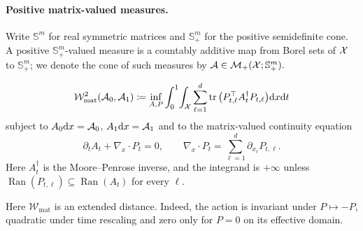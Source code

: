 \paragraph{Positive matrix-valued measures.}
\begin{defn}\label{def-positive-matrix-valued-measure}
Write $\mathbb S^m$ for real symmetric matrices and $\mathbb S_+^m$ for the positive semidefinite cone. A positive $\mathbb S_+^m$-valued measure is a countably additive map from Borel sets of $\mathcal{X}$ to $\mathbb S_+^m$; we denote the cone of such measures by
\(\mathcal A\in\mathcal{M}_+(\mathcal{X};\mathbb S_+^m).\)
\end{defn}
\begin{defn}\label{def-matrix-valued-dynamic-transport}
\begin{equation}\label{eq-matrix-valued-bb}
\begin{aligned}
\mathcal W_{\mathrm{mat}}^2(\mathcal A_0,\mathcal A_1)
\coloneqq
\inf_{A,P}\int_0^1\!\int_{\mathcal{X}}
\sum_{\ell=1}^d \operatorname{tr}\big(P_{t,\ell}^{\top} A_t^\dagger P_{t,\ell}\big)\mathrm{d} x\mathrm{d} t
\end{aligned}
\end{equation}
subject to $A_0\mathrm{d} x=\mathcal A_0$, $A_1\mathrm{d} x=\mathcal A_1$ and to the matrix-valued continuity equation
\begin{equation}\label{eq-matrix-valued-continuity}
\partial_t A_t+\nabla_x\cdot P_t=0,
\qquad
\nabla_x\cdot P_t=\sum_{\ell=1}^d \partial_{x_\ell}P_{t,\ell}.
\end{equation}
Here $A_t^\dagger$ is the Moore--Penrose inverse, and the integrand is $+\infty$ unless
$\operatorname{Ran}(P_{t,\ell})\subseteq\operatorname{Ran}(A_t)$ for every $\ell$.
\end{defn}
Here $\mathcal W_{\mathrm{mat}}$ is an extended distance. Indeed, the action is invariant under $P\mapsto-P$, quadratic under time rescaling and zero only for $P=0$ on its effective domain.

